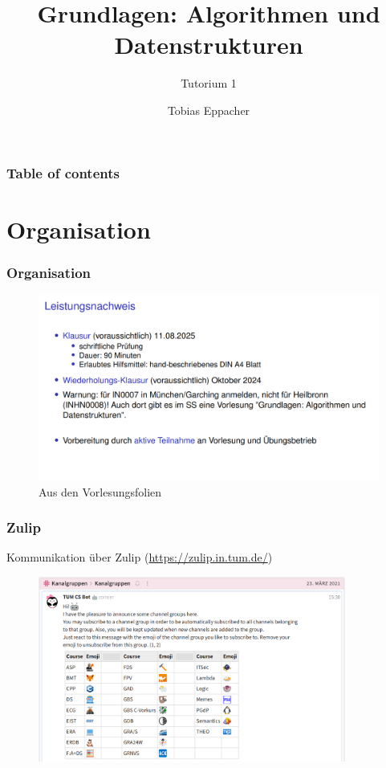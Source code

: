 \documentclass{beamer}
\title{Grundlagen: Algorithmen und Datenstrukturen}
\author{Tobias Eppacher}
\date{\presdatum}
\institute{School of Computation, Information and Technology}
\subtitle{Tutorium 1}
\begin{document}
\begin{frame}
	\titlepage
\end{frame}

\begin{frame}
	\frametitle{Table of contents}
	\tableofcontents[subsectionstyle=hide]
\end{frame}

\section{Organisation}

\begin{frame}
	\frametitle{Organisation}
	\begin{figure}
		\includegraphics[width=\textwidth]{images/orga.png}
		\caption{Aus den Vorlesungsfolien}
	\end{figure}
\end{frame}

\begin{frame}
	\frametitle{Zulip}
	Kommunikation über Zulip (\url{https://zulip.in.tum.de/})

	\begin{figure}
		\includegraphics[width=0.9\textwidth]{images/zulip-groups.png}
	\end{figure}
\end{frame}
\end{document}
